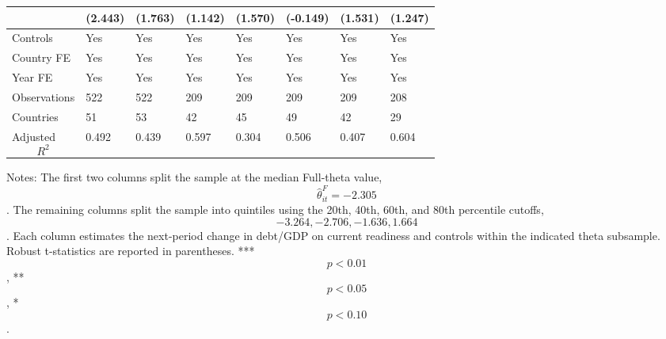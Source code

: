 \begin{table}[H]
\begin{threeparttable}
\begin{tabularx}{\textwidth}{lYYYYYYY}
  & (2.443) & (1.763) & (1.142) & (1.570) & (-0.149) & (1.531) & (1.247) \\
\midrule
Controls & Yes & Yes & Yes & Yes & Yes & Yes & Yes \\
Country FE & Yes & Yes & Yes & Yes & Yes & Yes & Yes \\
Year FE & Yes & Yes & Yes & Yes & Yes & Yes & Yes \\
Observations & 522 & 522 & 209 & 209 & 209 & 209 & 208 \\
Countries & 51 & 53 & 42 & 45 & 49 & 42 & 29 \\
Adjusted $$R^2$$ & 0.492 & 0.439 & 0.597 & 0.304 & 0.506 & 0.407 & 0.604 \\
\bottomrule
\end{tabularx}
\begin{tablenotes}[flushleft]\footnotesize
\item Notes: The first two columns split the sample at the median Full-theta value, $$\widehat{\theta}^{F}_{it}=-2.305$$. The remaining columns split the sample into quintiles using the 20th, 40th, 60th, and 80th percentile cutoffs, $$-3.264, -2.706, -1.636, 1.664$$. Each column estimates the next-period change in debt/GDP on current readiness and controls within the indicated theta subsample. Robust t-statistics are reported in parentheses. *** $$p<0.01$$, ** $$p<0.05$$, * $$p<0.10$$.
\end{tablenotes}
\end{threeparttable}
\end{table}
